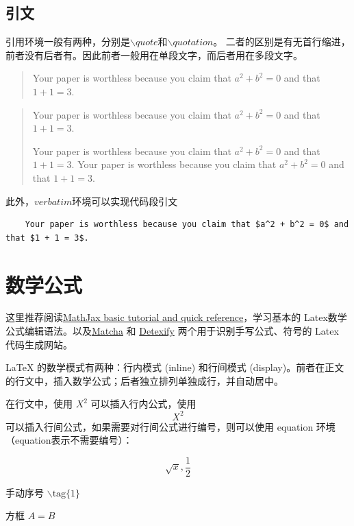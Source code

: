 \subsection{引文}
引用环境一般有两种，分别是$\backslash quote$和$\backslash quotation$。
二者的区别是有无首行缩进，前者没有后者有。因此前者一般用在单段文字，而后者用在多段文字。

\begin{quote}
    Your paper is worthless because you claim that $a^2 + b^2 = 0$ and that $1 + 1 = 3$.
\end{quote}

\begin{quotation}
    Your paper is worthless because you claim that $a^2 + b^2 = 0$ and that $1 + 1 = 3$.
    
    Your paper is worthless because you claim that $a^2 + b^2 = 0$ and that $1 + 1 = 3$.
    Your paper is worthless because you claim that $a^2 + b^2 = 0$ and that $1 + 1 = 3$.
\end{quotation}

此外，$verbatim$环境可以实现代码段引文
\begin{verbatim}
    Your paper is worthless because you claim that $a^2 + b^2 = 0$ and that $1 + 1 = 3$.
\end{verbatim}

\section{数学公式}
这里推荐阅读\href{https://math.meta.stackexchange.com/questions/5020/mathjax-basic-tutorial-and-quick-reference}{MathJax basic tutorial and quick reference}，学习基本的 Latex数学公式编辑语法。以及\href{http://mathcha.io}{Matcha} 和 \href{http://detexify.kirelabs.org/classify.html}{Detexify} 两个用于识别手写公式、符号的 Latex 代码生成网站。

LaTeX 的数学模式有两种：行内模式 (inline) 和行间模式 (display)。前者在正文的行文中，插入数学公式；后者独立排列单独成行，并自动居中。

在行文中，使用 $ X^2 $ 可以插入行内公式，使用 \[ X^2 \] 可以插入行间公式，如果需要对行间公式进行编号，则可以使用 equation 环境（equation表示不需要编号）：

\begin{equation}
\sqrt{x}, \frac{1}{2}
\end{equation}

手动序号 $\backslash\text{tag}\{1\}$ 

方框 $\boxed{A} = B$

